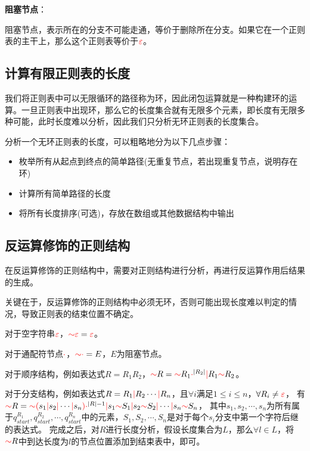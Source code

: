 \documentclass[12pt,a4paper,UTF8]{ctexart}
\newcommand{\func}[1]{\textcolor{red}{#1}}
\begin{document}
\vspace{8mm}
\textbf{阻塞节点}：

\qquad 阻塞节点，表示所在的分支不可能走通，等价于删除所在分支。如果它在一个正则表的主干上，那么这个正则表等价于$\func{\varepsilon}$。

\subsection{计算有限正则表的长度}

\qquad 我们将正则表中可以无限循环的路径称为环，因此闭包运算就是一种构建环的运算。一旦正则表中出现环，那么它的长度集合就有无限多个元素，即长度有无限多种可能，此时长度难以分析，因此我们只分析无环正则表的长度集合。

\qquad 分析一个无环正则表的长度，可以粗略地分为以下几点步骤：
\begin{itemize}
    \item 枚举所有从起点到终点的简单路径(无重复节点，若出现重复节点，说明存在环)
    \item 计算所有简单路径的长度
    \item 将所有长度排序(可选)，存放在数组或其他数据结构中输出
\end{itemize}

\subsection{反运算修饰的正则结构}

\qquad 在反运算修饰的正则结构中，需要对正则结构进行分析，再进行反运算作用后结果的生成。

\qquad 关键在于，反运算修饰的正则结构中必须无环，否则可能出现长度难以判定的情况，导致正则表的结束位置不确定。

\qquad 对于空字符串$\func{\varepsilon}$，$\func{\sim}\func{\varepsilon} = \func{\varepsilon}$。

\qquad 对于通配符节点$\func{\cdot}$，$\func{\sim}\func{\cdot} = E$，$E$为阻塞节点。

\qquad 对于顺序结构，例如表达式$R = R_1 R_2$，$\func{\sim}R = \func{\sim}R_1 \func{\cdot}^{|R_2|} \func{|} R_1\func{\sim}R_2$。

\qquad 对于分支结构，例如表达式$R = R_1\func{|}R_2\cdots\func{|}R_n$，且$\forall i$满足$1 \le i \le n$，$\forall R_i \ne \func{\varepsilon}$，
有$\func{\sim}R = \func{\sim}\func{(}s_1\func{|}s_2\func{|}\cdots\func{|}s_n\func{)}\func{\cdot}^{|R|-1} \func{|} s_1\func{\sim}S_1 \func{|} s_2\func{\sim}S_2 \func{|} \cdots \func{|} s_n\func{\sim}S_n$，
其中$s_1,s_2,\cdots,s_n$为所有属于$q_{start}^{R_1}, q_{start}^{R_2}, \cdots, q_{start}^{R_n}$中的元素，$S_1,S_2,\cdots,S_n$是对于每个$s_i$分支中第一个字符后继的表达式。
完成之后，对$R$进行长度分析，假设长度集合为$L$，那么$\forall l \in L$，将$\func{\sim}R$中到达长度为$l$的节点位置添加到结束表中，即可。
\end{document}
